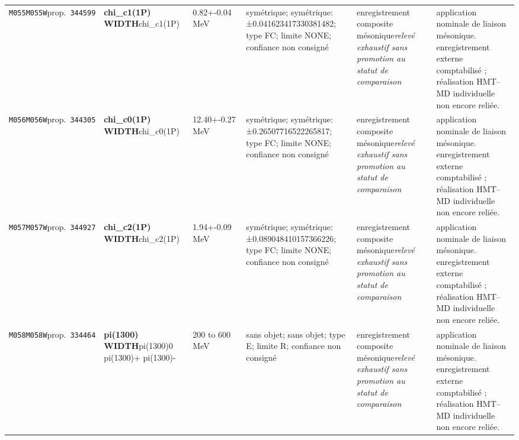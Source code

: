 \begin{landscape}
\begin{longtable}{L{1.85cm}L{4.45cm}L{2.35cm}L{4.05cm}L{3.35cm}L{7.15cm}}
\texttt{M055}\newline \texttt{M055W}\newline prop.\ \texttt{344599} & \textbf{chi\_\allowbreak{}c1(1P) WIDTH}\newline chi\_\allowbreak{}c1(1P) & 0.82+-0.04\,MeV & symétrique; symétrique: ±0.041623417330381482; type FC; limite NONE; confiance non consigné & enregistrement composite mésonique\newline \emph{relevé exhaustif sans promotion au statut de comparaison} & application nominale de liaison mésonique. enregistrement externe comptabilisé ; réalisation HMT--MD individuelle non encore reliée. \\
\texttt{M056}\newline \texttt{M056W}\newline prop.\ \texttt{344305} & \textbf{chi\_\allowbreak{}c0(1P) WIDTH}\newline chi\_\allowbreak{}c0(1P) & 12.40+-0.27\,MeV & symétrique; symétrique: ±0.26507716522265817; type FC; limite NONE; confiance non consigné & enregistrement composite mésonique\newline \emph{relevé exhaustif sans promotion au statut de comparaison} & application nominale de liaison mésonique. enregistrement externe comptabilisé ; réalisation HMT--MD individuelle non encore reliée. \\
\texttt{M057}\newline \texttt{M057W}\newline prop.\ \texttt{344927} & \textbf{chi\_\allowbreak{}c2(1P) WIDTH}\newline chi\_\allowbreak{}c2(1P) & 1.94+-0.09\,MeV & symétrique; symétrique: ±0.089048410157366226; type FC; limite NONE; confiance non consigné & enregistrement composite mésonique\newline \emph{relevé exhaustif sans promotion au statut de comparaison} & application nominale de liaison mésonique. enregistrement externe comptabilisé ; réalisation HMT--MD individuelle non encore reliée. \\
\texttt{M058}\newline \texttt{M058W}\newline prop.\ \texttt{334464} & \textbf{pi(1300) WIDTH}\newline pi(1300)0 \textbar{}\allowbreak{} pi(1300)+ \textbar{}\allowbreak{} pi(1300)- & 200 to 600\,MeV & sans objet; sans objet; type E; limite R; confiance non consigné & enregistrement composite mésonique\newline \emph{relevé exhaustif sans promotion au statut de comparaison} & application nominale de liaison mésonique. enregistrement externe comptabilisé ; réalisation HMT--MD individuelle non encore reliée. \\

\end{longtable}
\end{landscape}
